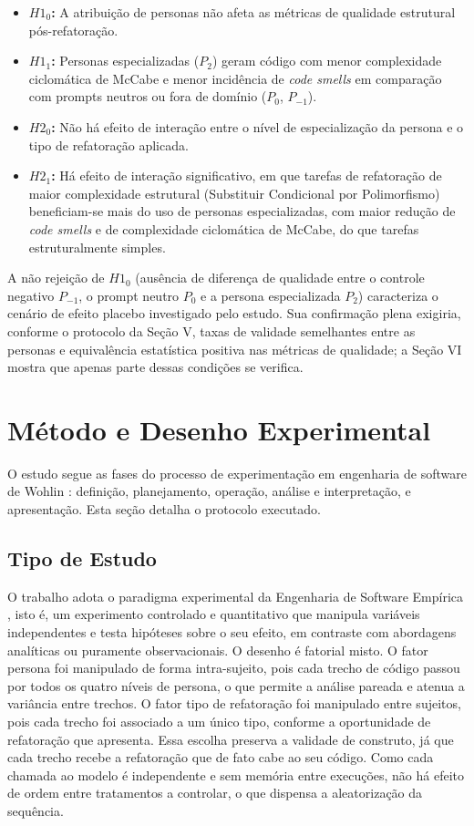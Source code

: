 \documentclass[10pt,conference,a4paper,twocolumn]{article}
\begin{document}
\begin{itemize}
    \item \textbf{$H1_0$:} A atribuição de personas não afeta as métricas de qualidade estrutural pós-refatoração.
    \item \textbf{$H1_1$:} Personas especializadas ($P_2$) geram código com menor complexidade ciclomática de McCabe e menor incidência de \textit{code smells} em comparação com prompts neutros ou fora de domínio ($P_0$, $P_{-1}$).
    \item \textbf{$H2_0$:} Não há efeito de interação entre o nível de especialização da persona e o tipo de refatoração aplicada.
    \item \textbf{$H2_1$:} Há efeito de interação significativo, em que tarefas de refatoração de maior complexidade estrutural (Substituir Condicional por Polimorfismo) beneficiam-se mais do uso de personas especializadas, com maior redução de \textit{code smells} e de complexidade ciclomática de McCabe, do que tarefas estruturalmente simples.
\end{itemize}

A não rejeição de $H1_0$ (ausência de diferença de qualidade entre o controle negativo $P_{-1}$, o prompt neutro $P_0$ e a persona especializada $P_2$) caracteriza o cenário de efeito placebo investigado pelo estudo. Sua confirmação plena exigiria, conforme o protocolo da Seção V, taxas de validade semelhantes entre as personas e equivalência estatística positiva nas métricas de qualidade; a Seção VI mostra que apenas parte dessas condições se verifica.

\section{Método e Desenho Experimental}
O estudo segue as fases do processo de experimentação em engenharia de software de Wohlin \cite{wohlin}: definição, planejamento, operação, análise e interpretação, e apresentação. Esta seção detalha o protocolo executado.

\subsection{Tipo de Estudo}
O trabalho adota o paradigma experimental da Engenharia de Software Empírica \cite{wohlin}, isto é, um experimento controlado e quantitativo que manipula variáveis independentes e testa hipóteses sobre o seu efeito, em contraste com abordagens analíticas ou puramente observacionais. O desenho é fatorial misto. O fator persona foi manipulado de forma intra-sujeito, pois cada trecho de código passou por todos os quatro níveis de persona, o que permite a análise pareada e atenua a variância entre trechos. O fator tipo de refatoração foi manipulado entre sujeitos, pois cada trecho foi associado a um único tipo, conforme a oportunidade de refatoração que apresenta. Essa escolha preserva a validade de construto, já que cada trecho recebe a refatoração que de fato cabe ao seu código. Como cada chamada ao modelo é independente e sem memória entre execuções, não há efeito de ordem entre tratamentos a controlar, o que dispensa a aleatorização da sequência.
\end{document}
